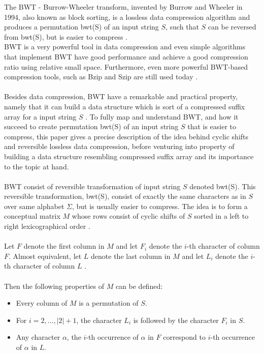 \documentclass[12pt]{article} %
\begin{document}
The BWT - Burrow-Wheeler transform, invented by Burrow and Wheeler in 1994, also known as block sorting, is a lossless data compression algorithm and produces a permutation bwt(S) of an input string $S$, such that $S$ can be reversed from bwt(S), but is easier to compress \cite{BWT}. \\
BWT is a very powerful tool in data compression and even simple algorithms that implement BWT have good performance and achieve a good compression ratio using relative small space. Furthermore, even more powerful BWT-based compression tools, such as Bzip and Szip are still used today \cite{BWT}.
\\ \\
Besides data compression, BWT have a remarkable and practical property, namely that it can build a data structure which is sort of a compressed suffix array for a input string $S$ \cite{BWT}. To fully map and understand BWT, and how it succeed to create permutation bwt(S) of an input string $S$ that is easier to compress, this paper gives a precise description of the idea behind cyclic shifts and reversible lossless data compression, before venturing into property of building a data structure resembling compressed suffix array and its importance to the topic at hand. 
\\ \\
BWT consist of reversible transformation of input string $S$ denoted bwt(S). This reversible transformation, bwt(S), consist of exactly the same characters as in $S$ over same alphabet $\Sigma$, but is usually easier to compress. The idea is to form a conceptual matrix $M$ whose rows consist of cyclic shifts of $S$ sorted in a left to right lexicographical order \cite{BWT}.
\\ \\
Let $F$ denote the first column in $M$ and let $F_i$ denote the $i$-th character of column $F$. Almost equivalent, let $L$ denote the last column in $M$ and let $L_i$ denote the $i$-th character of column $L$ \cite{BWT}.
\\ \\
Then the following properties of $M$ can be defined:
\begin{itemize}
  \item Every column of $M$ is a permutation of $S$.
  \item For $i=2, \ldots , |2| + 1$, the character $L_i$ is followed by the character $F_i$ in $S$.
  \item Any character $\alpha$, the $i$-th occurrence of $\alpha$ in $F$ correspond to $i$-th occurrence of $\alpha$ in $L$. 
\end{itemize}
\end{document}
